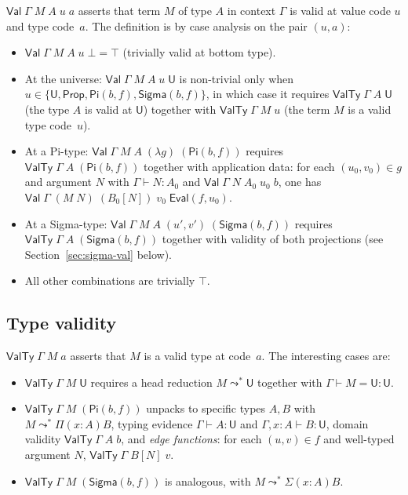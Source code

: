 \documentclass[11pt]{article}
\newcommand{\hastype}[3]{#1 \vdash #2 : #3}
\newcommand{\conveq}[4]{#1 \vdash #2 = #3 : #4}
\newcommand{\Pitype}[2]{\Pi(#1)#2}
\newcommand{\App}[2]{#1\;#2}
\newcommand{\substone}[2]{#1[#2]}
\newcommand{\U}{\mathsf{U}}
\newcommand{\Prop}{\mathsf{Prop}}
\newcommand{\PiC}[2]{\mathsf{Pi}(#1,#2)}
\newcommand{\SigmaC}[2]{\mathsf{Sigma}(#1,#2)}
\newcommand{\Red}{\mathrel{\leadsto^*}}
\newcommand{\Sigmatype}[2]{\Sigma(#1)#2}
\newcommand{\Val}{\mathsf{Val}}
\newcommand{\ValTy}{\mathsf{ValTy}}
\newcommand{\EvalFun}{\mathsf{Eval}}
\newcommand{\Bot}{\bot}
\begin{document}
$\Val\;\Gamma\;M\;A\;u\;a$ asserts that term $M$ of type $A$ in context
$\Gamma$ is valid at value code $u$ and type code~$a$.  The definition is
by case analysis on the pair $(u, a)$:
\begin{itemize}
\item $\Val\;\Gamma\;M\;A\;u\;\Bot = \top$ \quad (trivially valid at bottom type).
\item At the universe: $\Val\;\Gamma\;M\;A\;u\;\U$ is non-trivial only when
  $u \in \{\U, \Prop, \PiC{b}{f}, \SigmaC{b}{f}\}$, in which case it
  requires $\ValTy\;\Gamma\;A\;\U$ (the type $A$ is valid at $\U$) together
  with $\ValTy\;\Gamma\;M\;u$ (the term $M$ is a valid type code~$u$).
\item At a Pi-type: $\Val\;\Gamma\;M\;A\;(\lambda g)\;(\PiC{b}{f})$ requires
  $\ValTy\;\Gamma\;A\;(\PiC{b}{f})$ together with application data: for each
  $(u_0, v_0) \in g$ and argument $N$ with $\hastype{\Gamma}{N}{A_0}$ and
  $\Val\;\Gamma\;N\;A_0\;u_0\;b$, one has
  $\Val\;\Gamma\;(\App{M}{N})\;(\substone{B_0}{N})\;v_0\;\EvalFun(f, u_0)$.
\item At a Sigma-type: $\Val\;\Gamma\;M\;A\;(u',v')\;(\SigmaC{b}{f})$
  requires $\ValTy\;\Gamma\;A\;(\SigmaC{b}{f})$ together with validity
  of both projections (see Section~\ref{sec:sigma-val} below).
\item All other combinations are trivially $\top$.
\end{itemize}

\subsection{Type validity}

$\ValTy\;\Gamma\;M\;a$ asserts that $M$ is a valid type at code~$a$.
The interesting cases are:
\begin{itemize}
\item $\ValTy\;\Gamma\;M\;\U$ requires a head reduction
  $M \Red \U$ together with $\conveq{\Gamma}{M}{\U}{\U}$.
\item $\ValTy\;\Gamma\;M\;(\PiC{b}{f})$ unpacks to specific
  types $A,B$ with $M \Red \Pitype{x{:}A}{B}$, typing evidence
  $\hastype{\Gamma}{A}{\U}$ and $\hastype{\Gamma,x{:}A}{B}{\U}$,
  domain validity $\ValTy\;\Gamma\;A\;b$, and \emph{edge functions}:
  for each $(u,v) \in f$ and well-typed argument $N$,
  $\ValTy\;\Gamma\;\substone{B}{N}\;v$.
\item $\ValTy\;\Gamma\;M\;(\SigmaC{b}{f})$ is analogous, with
  $M \Red \Sigmatype{x{:}A}{B}$.
\end{itemize}
\end{document}
